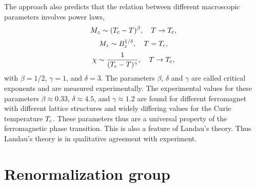 The approach also predicts that the relation between different macroscopic parameters involves power laws,
\[M_z \sim (T_{\rm c} - T)^{\beta} , \quad T \to T_{\rm c},\]
\[M_z \sim B_z^{1/\delta} , \quad T = T_{\rm c},\]
\[\chi \sim \frac{1}{(T_{\rm c}-T)^{\gamma}} , \quad T \to T_{\rm c},\]
with $\beta = {1}/{2}$, $\gamma = 1$, and $\delta = 3$. The parameters $\beta$, $\delta$ and $\gamma$ are called critical exponents and are measured experimentally. 
The experimental values for these parameters
$\beta \approx 0.33$, $\delta \approx 4.5$, and $\gamma \approx 1.2$ are found for different ferromagnet with different lattice structures and widely differing values for the Curie temperature $T_{\rm c}$. 
These parameters thus are a universal property of the ferromagnetic phase transition. This is also a feature of Landau's theory. Thus Landau's theory is in qualitative
agreement with experiment.

\section{Renormalization group}

